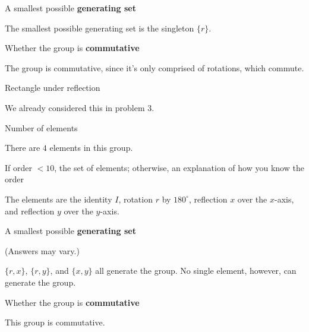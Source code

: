 \documentclass[../gatm_answers.tex]{subfiles}
\begin{document}
\begin{inner_problem}
\item A smallest possible \textbf{generating set}
\end{inner_problem}

The smallest possible generating set is the singleton $\{r\}$.

\begin{inner_problem}
\item Whether the group is \textbf{commutative}
\end{inner_problem}

The group is commutative, since it's only comprised of rotations, which commute.

\begin{outer_problem}
\item Rectangle under reflection
\end{outer_problem}

We already considered this in problem $3$.

\begin{inner_problem}[start=1]
\item Number of elements
\end{inner_problem}

There are $4$ elements in this group.

\begin{inner_problem}
\item If order $< 10$, the set of elements; otherwise, an explanation of how you know the order
\end{inner_problem}

The elements are the identity $I$, rotation $r$ by $180^\circ$, reflection $x$ over the $x$-axis, and reflection $y$ over the $y$-axis.

\begin{inner_problem}
\item A smallest possible \textbf{generating set}
\end{inner_problem}

(Answers may vary.)

$\{r,x\}$, $\{r,y\}$, and $\{x,y\}$ all generate the group. No single element, however, can generate the group.

\begin{inner_problem}
\item Whether the group is \textbf{commutative}
\end{inner_problem}

This group is commutative.
\end{document}
